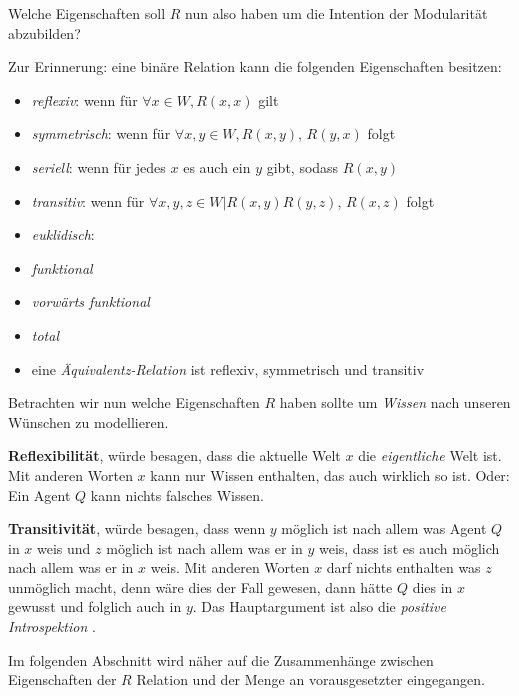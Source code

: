 Welche Eigenschaften soll $R$ nun also haben um die Intention der Modularität abzubilden?

Zur Erinnerung: eine binäre Relation kann die folgenden Eigenschaften besitzen:
\begin{itemize}
	\item \emph{reflexiv}: wenn für $\forall x \in W, R(x,x)$ gilt
	\item \emph{symmetrisch}: wenn für $\forall x,y \in W, R(x,y)$, $R(y,x)$ folgt
	\item \emph{seriell}: wenn für jedes $x$ es auch ein $y$ gibt, sodass $R(x,y)$
	\item \emph{transitiv}: wenn für $\forall x,y,z \in W | R(x,y) R(y,z)$, $R(x,z)$ folgt
	\item \emph{euklidisch}: 
	\item \emph{funktional}
	\item \emph{vorwärts funktional} 
	\item \emph{total}
	\item eine \emph{Äquivalentz-Relation} ist reflexiv, symmetrisch und transitiv
\end{itemize}

Betrachten wir nun welche Eigenschaften $R$ haben sollte um \emph{Wissen} nach unseren Wünschen zu modellieren.

\textbf{Reflexibilität}, würde besagen, dass die aktuelle Welt $x$ die \emph{eigentliche} Welt ist.
Mit anderen Worten $x$ kann nur Wissen enthalten, das auch wirklich so ist.
Oder: Ein Agent $Q$ kann nichts falsches Wissen.

\textbf{Transitivität}, würde besagen, dass wenn $y$ möglich ist nach allem was Agent $Q$ in $x$ weis und $z$ möglich ist nach allem was er in $y$ weis, dass ist es auch möglich nach allem was er in $x$ weis.
Mit anderen Worten $x$ darf nichts enthalten was $z$ unmöglich macht, denn wäre dies der Fall gewesen, dann hätte $Q$ dies in $x$ gewusst und folglich auch in $y$.
Das Hauptargument ist also die \emph{positive Introspektion} \vierFormel {}.

Im folgenden Abschnitt wird näher auf die Zusammenhänge zwischen Eigenschaften der $R$ Relation und der Menge an vorausgesetzter \formelSchemata eingegangen. 







